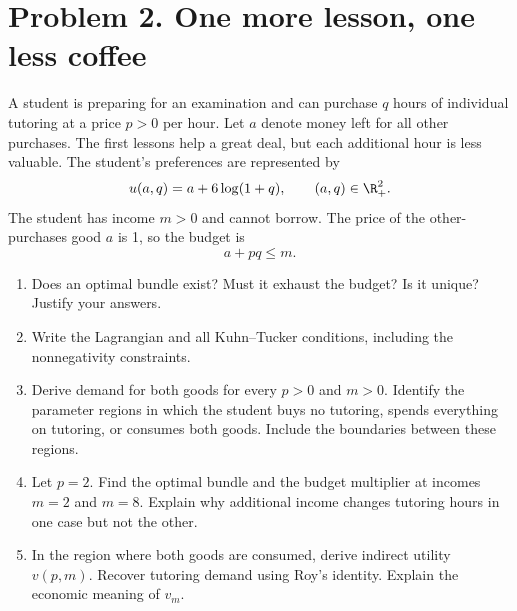 \section*{Problem 2. One more lesson, one less coffee}
A student is preparing for an examination and can purchase $q$ hours of individual tutoring at a price $p>0$ per hour. Let $a$ denote money left for all other purchases. The first lessons help a great deal, but each additional hour is less valuable. The student's preferences are represented by
\[
 u(a,q)=a+6\log(1+q),\qquad (a,q)\in\R_+^2.
\]
The student has income $m>0$ and cannot borrow. The price of the other-purchases good $a$ is 1, so the budget is
\[
 a+pq\le m.
\]
\begin{enumerate}[label=(\alph*)]
\item Does an optimal bundle exist? Must it exhaust the budget? Is it unique? Justify your answers.
\item Write the Lagrangian and all Kuhn--Tucker conditions, including the nonnegativity constraints.
\item Derive demand for both goods for every $p>0$ and $m>0$. Identify the parameter regions in which the student buys no tutoring, spends everything on tutoring, or consumes both goods. Include the boundaries between these regions.
\item Let $p=2$. Find the optimal bundle and the budget multiplier at incomes $m=2$ and $m=8$. Explain why additional income changes tutoring hours in one case but not the other.
\item In the region where both goods are consumed, derive indirect utility $v(p,m)$. Recover tutoring demand using Roy's identity. Explain the economic meaning of $v_m$.
\end{enumerate}
